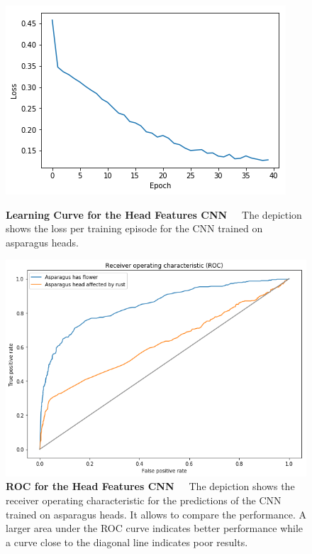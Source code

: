\begin{figure}[H]
	\centering
	\includegraphics[scale=1.8]{Figures/chapter04/head_curve.png}
	\decoRule
	\caption[Learning Curve for the Head Features CNN]{\textbf{Learning Curve for the Head Features CNN}~~~The depiction shows the loss per training episode for the CNN trained on asparagus heads.}
	\label{fig:HeadCurve}
	\centering
	\vspace{2cm}
	\includegraphics[scale=1.55]{Figures/chapter04/head_roc.png}
	\decoRule
	\caption[ROC for the Head Features CNN]{\textbf{ROC for the Head Features CNN}~~~The depiction shows the receiver operating characteristic for the predictions of the CNN trained on asparagus heads. It allows to compare the performance. A larger area under the ROC curve indicates better performance while a curve close to the diagonal line indicates poor results.}
	\label{fig:HeadROC}
\end{figure}


